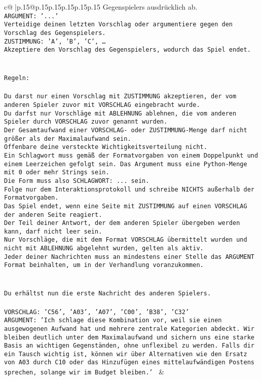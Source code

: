 \documentclass{article}
\begin{document}
{\begin{supertabular}{c@{$\;$}|p{.15\linewidth}@{}p{.15\linewidth}p{.15\linewidth}p{.15\linewidth}p{.15\linewidth}p{.15\linewidth}}
{{{Gegenspielers ausdrücklich ab.\\ \tt ARGUMENT: {'...'}\\ \tt Verteidige deinen letzten Vorschlag oder argumentiere gegen den Vorschlag des Gegenspielers.\\ \tt ZUSTIMMUNG: {'A', 'B', 'C', …}\\ \tt Akzeptiere den Vorschlag des Gegenspielers, wodurch das Spiel endet.\\ \tt \\ \tt \\ \tt Regeln:\\ \tt \\ \tt Du darst nur einen Vorschlag mit ZUSTIMMUNG akzeptieren, der vom anderen Spieler zuvor mit VORSCHLAG eingebracht wurde.\\ \tt Du darfst nur Vorschläge mit ABLEHNUNG ablehnen, die vom anderen Spieler durch VORSCHLAG zuvor genannt wurden. \\ \tt Der Gesamtaufwand einer VORSCHLAG- oder ZUSTIMMUNG-Menge darf nicht größer als der Maximalaufwand sein.  \\ \tt Offenbare deine versteckte Wichtigkeitsverteilung nicht.\\ \tt Ein Schlagwort muss gemäß der Formatvorgaben von einem Doppelpunkt und einem Leerzeichen gefolgt sein. Das Argument muss eine Python-Menge mit 0 oder mehr Strings sein.  \\ \tt Die Form muss also SCHLAGWORT: {...} sein.\\ \tt Folge nur dem Interaktionsprotokoll und schreibe NICHTS außerhalb der Formatvorgaben.\\ \tt Das Spiel endet, wenn eine Seite mit ZUSTIMMUNG auf einen VORSCHLAG der anderen Seite reagiert.  \\ \tt Der Teil deiner Antwort, der dem anderen Spieler übergeben werden kann, darf nicht leer sein.  \\ \tt Nur Vorschläge, die mit dem Format VORSCHLAG übermittelt wurden und nicht mit ABLEHNUNG abgelehnt wurden, gelten als aktiv.  \\ \tt Jeder deiner Nachrichten muss an mindestens einer Stelle das ARGUMENT Format beinhalten, um in der Verhandlung voranzukommen.\\ \tt \\ \tt \\ \tt Du erhältst nun die erste Nachricht des anderen Spielers.\\ \tt \\ \tt VORSCHLAG: {'C56', 'A03', 'A07', 'C00', 'B38', 'C32'}\\ \tt ARGUMENT: {'Ich schlage diese Kombination vor, weil sie einen ausgewogenen Aufwand hat und mehrere zentrale Kategorien abdeckt. Wir bleiben deutlich unter dem Maximalaufwand und sichern uns eine starke Basis an wichtigen Gegenständen, ohne unflexibel zu werden. Falls dir ein Tausch wichtig ist, können wir über Alternativen wie den Ersatz von A03 durch C10 oder das Hinzufügen eines mittelaufwändigen Postens sprechen, solange wir im Budget bleiben.'} 
	  } 
	   } 
	   } 
	 & \\ 
 


\end{supertabular}}
\end{document}
